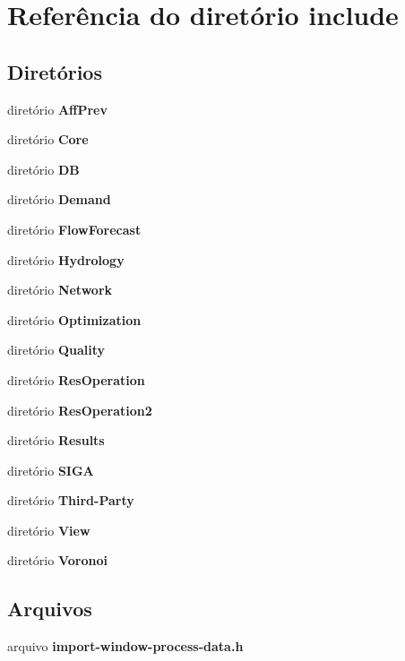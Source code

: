 \section{Referência do diretório include}
\label{dir_d44c64559bbebec7f509842c48db8b23}
\subsection*{Diretórios}
\begin{DoxyCompactItemize}
\item 
diretório {\bf Aff\+Prev}
\item 
diretório {\bf Core}
\item 
diretório {\bf DB}
\item 
diretório {\bf Demand}
\item 
diretório {\bf Flow\+Forecast}
\item 
diretório {\bf Hydrology}
\item 
diretório {\bf Network}
\item 
diretório {\bf Optimization}
\item 
diretório {\bf Quality}
\item 
diretório {\bf Res\+Operation}
\item 
diretório {\bf Res\+Operation2}
\item 
diretório {\bf Results}
\item 
diretório {\bf S\+I\+GA}
\item 
diretório {\bf Third-\/\+Party}
\item 
diretório {\bf View}
\item 
diretório {\bf Voronoi}
\end{DoxyCompactItemize}
\subsection*{Arquivos}
\begin{DoxyCompactItemize}
\item 
arquivo {\bf import-\/window-\/process-\/data.\+h}
\end{DoxyCompactItemize}
